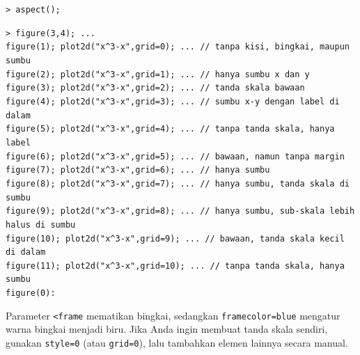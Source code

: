 \documentclass[11pt, a4paper]{article}
\newcommand{\emtcmd}[1]{\noindent\texttt{\textcolor{emtcommand}{>}\ #1}\par\smallskip}
\begin{document}
\emtcmd{aspect();}
\emtcmd{figure(3,4); ... \\
\hspace*{1em} figure(1); plot2d("x\^{}3-x",grid=0); ... \textcolor{emtcomment}{// tanpa kisi, bingkai, maupun sumbu} \\
\hspace*{1em} figure(2); plot2d("x\^{}3-x",grid=1); ... \textcolor{emtcomment}{// hanya sumbu x dan y} \\
\hspace*{1em} figure(3); plot2d("x\^{}3-x",grid=2); ... \textcolor{emtcomment}{// tanda skala bawaan} \\
\hspace*{1em} figure(4); plot2d("x\^{}3-x",grid=3); ... \textcolor{emtcomment}{// sumbu x-y dengan label di dalam} \\
\hspace*{1em} figure(5); plot2d("x\^{}3-x",grid=4); ... \textcolor{emtcomment}{// tanpa tanda skala, hanya label} \\
\hspace*{1em} figure(6); plot2d("x\^{}3-x",grid=5); ... \textcolor{emtcomment}{// bawaan, namun tanpa margin} \\
\hspace*{1em} figure(7); plot2d("x\^{}3-x",grid=6); ... \textcolor{emtcomment}{// hanya sumbu} \\
\hspace*{1em} figure(8); plot2d("x\^{}3-x",grid=7); ... \textcolor{emtcomment}{// hanya sumbu, tanda skala di sumbu} \\
\hspace*{1em} figure(9); plot2d("x\^{}3-x",grid=8); ... \textcolor{emtcomment}{// hanya sumbu, sub-skala lebih halus di sumbu} \\
\hspace*{1em} figure(10); plot2d("x\^{}3-x",grid=9); ... \textcolor{emtcomment}{// bawaan, tanda skala kecil di dalam} \\
\hspace*{1em} figure(11); plot2d("x\^{}3-x",grid=10); ... \textcolor{emtcomment}{// tanpa tanda skala, hanya sumbu} \\
\hspace*{1em} figure(0):}

Parameter \texttt{<frame} mematikan bingkai, sedangkan \texttt{framecolor=blue} mengatur warna bingkai menjadi biru. Jika Anda ingin membuat tanda skala sendiri, gunakan \texttt{style=0} (atau \texttt{grid=0}), lalu tambahkan elemen lainnya secara manual.
\end{document}
